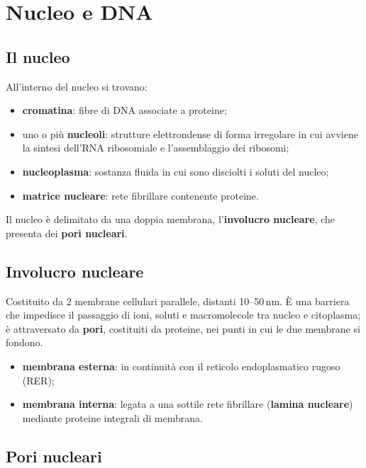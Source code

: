 \section{Nucleo e DNA}

\subsection{Il nucleo}

All'interno del nucleo si trovano:
\begin{itemize}
  \item \textbf{cromatina}: fibre di DNA associate a proteine;
  \item uno o più \textbf{nucleoli}: strutture elettrondense di forma irregolare in cui avviene la sintesi dell'RNA ribosomiale e l'assemblaggio dei ribosomi;
  \item \textbf{nucleoplasma}: sostanza fluida in cui sono disciolti i soluti del nucleo;
  \item \textbf{matrice nucleare}: rete fibrillare contenente proteine.
\end{itemize}
Il nucleo è delimitato da una doppia membrana, l'\textbf{involucro nucleare}, che presenta dei \textbf{pori nucleari}.

\subsection{Involucro nucleare}

Costituito da 2 membrane cellulari parallele, distanti 10--50\,nm. È una barriera che impedisce il passaggio di ioni, soluti e macromolecole tra nucleo e citoplasma; è attraversato da \textbf{pori}, costituiti da proteine, nei punti in cui le due membrane si fondono.

\begin{itemize}
  \item \textbf{membrana esterna}: in continuità con il reticolo endoplasmatico rugoso (RER);
  \item \textbf{membrana interna}: legata a una sottile rete fibrillare (\textbf{lamina nucleare}) mediante proteine integrali di membrana.
\end{itemize}

\subsection{Pori nucleari}

